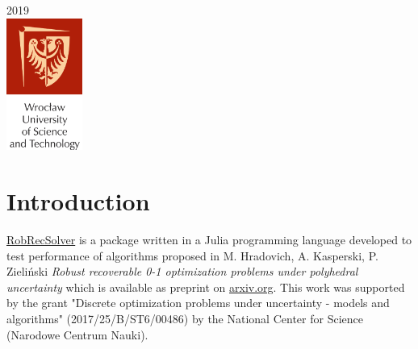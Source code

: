 \begin{titlepage}


{\large 2019}\\[0.5cm] %


\includegraphics[width=2.5cm]{logo.png} %
 

\vfill %

\end{titlepage}

\tableofcontents{\protect\newpage}

\section{Introduction}

\href{https://github.com/nikagra/RobRecSolver.jl}{RobRecSolver} is a package written in a Julia programming language developed to test performance of algorithms proposed in M. Hradovich, A. Kasperski, P. Zieliński \textit{Robust recoverable 0-1 optimization problems under polyhedral uncertainty}\cite{DBLP:journals/corr/abs-1811-06719} 
which is available as preprint on \href{https://arxiv.org/abs/1811.06719}{arxiv.org}. This work was supported by the grant "Discrete optimization problems under uncertainty - models and algorithms" (2017/25/B/ST6/00486) by  the  National  Center  for  Science  (Narodowe
Centrum Nauki).

